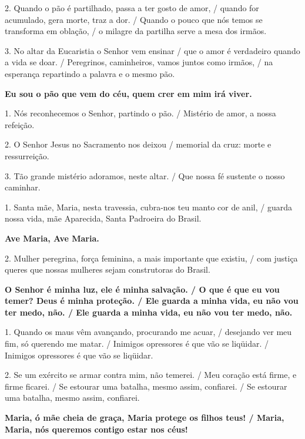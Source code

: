 \documentclass[a5paper,9pt]{extarticle}
\begin{document}
\begin{cantos}
\begin{canto}
2. Quando o pão é partilhado, passa a ter gosto de amor, / quando for acumulado, gera morte, traz a dor. / Quando o pouco que nós temos se transforma em oblação, / o milagre da partilha serve a mesa dos irmãos.

3. No altar da Eucaristia o Senhor vem ensinar / que o amor é verdadeiro quando a vida se doar. / Peregrinos, caminheiros, vamos juntos como irmãos, / na esperança repartindo a palavra e o mesmo pão.
\end{canto}

\begin{canto}
\textbf{Eu sou o pão que vem do céu, quem crer em mim irá viver.}

1. Nós reconhecemos o Senhor, partindo o pão. / Mistério de amor, a nossa refeição.

2. O Senhor Jesus no Sacramento nos deixou / memorial da cruz: morte e ressurreição.

3. Tão grande mistério adoramos, neste altar. / Que nossa fé sustente o nosso caminhar.
\end{canto}

\begin{canto}
1. Santa mãe, Maria, nesta travessia, cubra-nos teu manto cor de anil, / guarda nossa vida, mãe Aparecida, Santa Padroeira do Brasil.

\textbf{Ave Maria, Ave Maria. }

2. Mulher peregrina, força feminina, a mais importante que existiu, / com justiça queres que nossas mulheres sejam construtoras do Brasil.
\end{canto}

\begin{canto}
\textbf{O Senhor é minha luz, ele é minha salvação. / O que é que eu vou temer? Deus é minha proteção. / Ele guarda a minha vida, eu não vou ter medo, não. / Ele guarda a minha vida, eu não vou ter medo, não.}

1. Quando os maus vêm avançando, procurando me acuar, / desejando ver meu fim, só querendo me matar. / Inimigos opressores é que vão se liqüidar. / Inimigos opressores é que vão se liqüidar.

2. Se um exército se armar contra mim, não temerei. / Meu coração está firme, e firme ficarei. / Se estourar uma batalha, mesmo assim, confiarei. / Se estourar uma batalha, mesmo assim, confiarei.
\end{canto}

\begin{canto}
\textbf{Maria, ó mãe cheia de graça, Maria protege os filhos teus! / Maria, Maria, nós queremos contigo estar nos céus!}


\end{canto}
\end{cantos}
\end{document}
